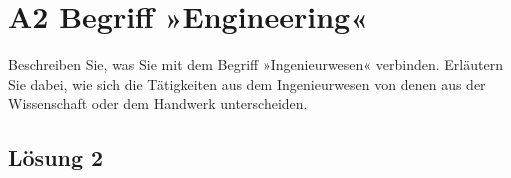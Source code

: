 \documentclass[main.tex]{subfiles}
\begin{document}
\section{A2 Begriff »Engineering«}
Beschreiben Sie, was Sie mit dem Begriff »Ingenieurwesen« verbinden. Erläutern Sie dabei, wie
sich die Tätigkeiten aus dem Ingenieurwesen von denen aus der Wissenschaft oder dem Handwerk unterscheiden.

\subsection{Lösung 2}
\end{document}
